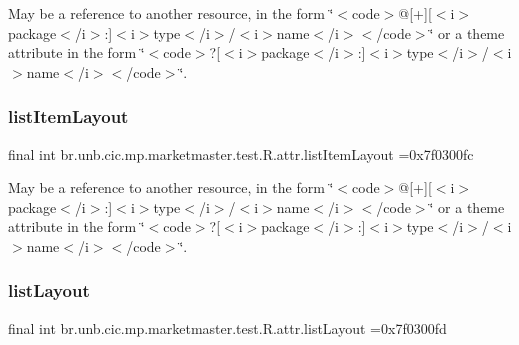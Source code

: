 May be a reference to another resource, in the form \char`\"{}$<$code$>$@\mbox{[}+\mbox{]}\mbox{[}$<$i$>$package$<$/i$>$\+:\mbox{]}$<$i$>$type$<$/i$>$/$<$i$>$name$<$/i$>$$<$/code$>$\char`\"{} or a theme attribute in the form \char`\"{}$<$code$>$?\mbox{[}$<$i$>$package$<$/i$>$\+:\mbox{]}$<$i$>$type$<$/i$>$/$<$i$>$name$<$/i$>$$<$/code$>$\char`\"{}. \mbox{\label{classbr_1_1unb_1_1cic_1_1mp_1_1marketmaster_1_1test_1_1R_1_1attr_addb3f4aa3469fd31e62def6a01f9193e}} 
\subsubsection{\texorpdfstring{list\+Item\+Layout}{listItemLayout}}
{\footnotesize\ttfamily final int br.\+unb.\+cic.\+mp.\+marketmaster.\+test.\+R.\+attr.\+list\+Item\+Layout =0x7f0300fc\hspace{0.3cm}{\ttfamily [static]}}

May be a reference to another resource, in the form \char`\"{}$<$code$>$@\mbox{[}+\mbox{]}\mbox{[}$<$i$>$package$<$/i$>$\+:\mbox{]}$<$i$>$type$<$/i$>$/$<$i$>$name$<$/i$>$$<$/code$>$\char`\"{} or a theme attribute in the form \char`\"{}$<$code$>$?\mbox{[}$<$i$>$package$<$/i$>$\+:\mbox{]}$<$i$>$type$<$/i$>$/$<$i$>$name$<$/i$>$$<$/code$>$\char`\"{}. \mbox{\label{classbr_1_1unb_1_1cic_1_1mp_1_1marketmaster_1_1test_1_1R_1_1attr_a9592dd7b119132213ed522e4b2106cce}} 
\subsubsection{\texorpdfstring{list\+Layout}{listLayout}}
{\footnotesize\ttfamily final int br.\+unb.\+cic.\+mp.\+marketmaster.\+test.\+R.\+attr.\+list\+Layout =0x7f0300fd\hspace{0.3cm}{\ttfamily [static]}}

